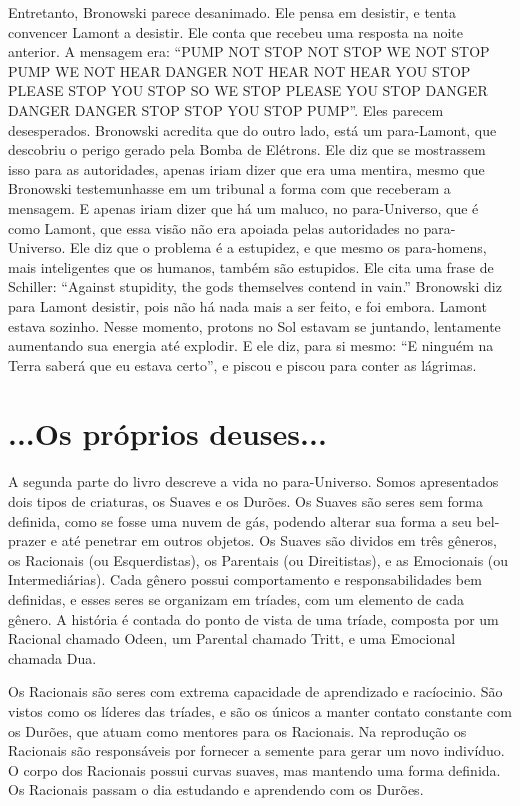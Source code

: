 \documentclass[14pt,portuguese]{extreport}
\begin{document}
	  Entretanto, Bronowski parece desanimado. Ele pensa em desistir, e tenta convencer Lamont a 
	  desistir. Ele conta que recebeu uma resposta na noite anterior. A mensagem era: 
	  “PUMP NOT STOP NOT STOP WE NOT STOP PUMP WE NOT HEAR DANGER NOT HEAR NOT HEAR YOU STOP PLEASE 
	  STOP YOU STOP SO WE STOP PLEASE YOU STOP DANGER DANGER DANGER STOP STOP YOU STOP PUMP”. 
	  Eles parecem desesperados. Bronowski acredita que do outro lado, está um para-Lamont, que 
	  descobriu o perigo gerado pela Bomba de Elétrons. Ele diz que se mostrassem isso para as 
	  autoridades, apenas iriam dizer que era uma mentira, mesmo que Bronowski testemunhasse 
	  em um tribunal a forma com que receberam a mensagem. E apenas iriam dizer que há um maluco, 
	  no para-Universo, que é como Lamont, que essa visão não era apoiada pelas autoridades no 
	  para-Universo. Ele diz que o problema é a estupidez, e que mesmo os para-homens, mais 
	  inteligentes que os humanos, também são estupidos. Ele cita uma frase de Schiller: 
	  “Against stupidity, the gods themselves contend in vain.” Bronowski diz para Lamont 
	  desistir, pois não há nada mais a ser feito, e foi embora. Lamont estava sozinho. 
	  Nesse momento, protons no Sol estavam se juntando, lentamente aumentando sua energia até 
	  explodir. E ele diz, para si mesmo: “E ninguém na Terra saberá que eu estava certo”, 
	  e piscou e piscou para conter as lágrimas.

    \section{...Os próprios deuses...}

      A segunda parte do livro descreve a vida no para-Universo. Somos apresentados
      dois tipos de criaturas, os Suaves e os Durões. Os Suaves são seres sem forma definida,
      como se fosse uma nuvem de gás, podendo alterar sua forma a seu bel-prazer e até penetrar em outros objetos. 
      Os Suaves são dividos em três gêneros, os Racionais (ou Esquerdistas), os Parentais (ou Direitistas), 
      e as Emocionais (ou Intermediárias). Cada gênero possui comportamento e responsabilidades
      bem definidas, e esses seres se organizam em tríades, com um elemento de cada gênero. A história
      é contada do ponto de vista de uma tríade, composta por um Racional chamado Odeen, um Parental chamado Tritt,
      e uma Emocional chamada Dua.
      
      Os Racionais são seres com extrema capacidade de aprendizado e racíocinio. São vistos como os líderes das tríades,
      e são os únicos a manter contato constante com os Durões, que atuam como mentores para os Racionais. Na reprodução 
      os Racionais são responsáveis por fornecer a semente para gerar um novo indivíduo. O corpo dos Racionais possui curvas
      suaves, mas mantendo uma forma definida. Os Racionais passam o dia estudando e aprendendo com os Durões.
      
\end{document}
